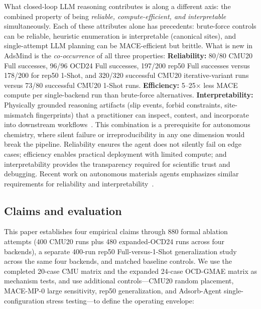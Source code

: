 What closed-loop LLM reasoning contributes is along a different axis: the combined property of being \textit{reliable, compute-efficient, and interpretable} simultaneously.
Each of these attributes alone has precedents: brute-force controls can be reliable, heuristic enumeration is interpretable (canonical sites), and single-attempt LLM planning can be MACE-efficient but brittle.
What is new in AdsMind is the \textit{co-occurrence} of all three properties:
\textbf{Reliability:} 80/80 CMU20 Full successes, 96/96 OCD24 Full successes, 197/200 rep50 Full successes versus 178/200 for rep50 1-Shot, and 320/320 successful CMU20 iterative-variant runs versus 73/80 successful CMU20 1-Shot runs.
\textbf{Efficiency:} 5--25$\times$ less MACE compute per single-backend run than brute-force alternatives.
\textbf{Interpretability:} Physically grounded reasoning artifacts (slip events, forbid constraints, site-mismatch fingerprints) that a practitioner can inspect, contest, and incorporate into downstream workflows~\cite{zhang2026matclaw,huang2026towards}.
This combination is a prerequisite for autonomous chemistry, where silent failure or irreproducibility in any one dimension would break the pipeline.
Reliability ensures the agent does not silently fail on edge cases; efficiency enables practical deployment with limited compute; and interpretability provides the transparency required for scientific trust and debugging.
Recent work on autonomous materials agents emphasizes similar requirements for reliability and interpretability~\cite{zhang2026towards,yang2026quasar}.



\subsection{Claims and evaluation}

This paper establishes four empirical claims through 880 formal ablation attempts (400 CMU20 runs plus 480 expanded-OCD24 runs across four backends), a separate 400-run rep50 Full-versus-1-Shot generalization study across the same four backends, and matched baseline controls.
We use the completed 20-case CMU matrix and the expanded 24-case OCD-GMAE matrix as mechanism tests, and use additional controls---CMU20 random placement, MACE-MP-0 large sensitivity, rep50 generalization, and Adsorb-Agent single-configuration stress testing---to define the operating envelope:

